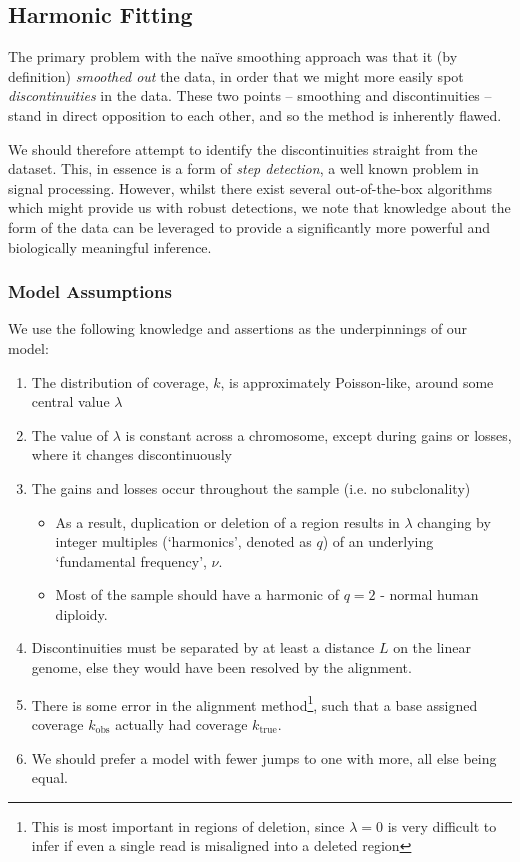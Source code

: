 \documentclass[fleqn,usenatbib]{mnras}
\begin{document}
		\subsection{Harmonic Fitting}

			The primary problem with the na\"ive smoothing approach was that it (by definition) \textit{smoothed out} the data, in order that we might more easily spot \textit{discontinuities} in the data. These two points -- smoothing and discontinuities -- stand in direct opposition to each other, and so the method is inherently flawed.

			We should therefore attempt to identify the discontinuities straight from the dataset. This, in essence is a form of \textit{step detection}, a well known problem in signal processing. However, whilst there exist several out-of-the-box algorithms which might provide us with robust detections, we note that knowledge about the form of the data can be leveraged to provide a significantly more powerful and biologically meaningful inference. 
			
			\subsubsection{Model Assumptions}
			
				We use the following knowledge and assertions as the underpinnings of our model:

				\begin{enumerate}
					\item The distribution of coverage, $k$, is approximately Poisson-like, around some central value $\lambda$
					\item The value of $\lambda$ is constant across a chromosome, except during gains or losses, where it changes discontinuously
					\item The gains and losses occur throughout the sample (i.e. no subclonality)
					\begin{itemize}
						\item As a result, duplication or deletion of a region results in $\lambda$ changing by integer multiples (`harmonics', denoted as $q$) of an underlying `fundamental frequency', $\nu$.
						\item Most of the sample should have a harmonic of $q = 2$ - normal human diploidy.
					\end{itemize}
					\item Discontinuities must be separated by at least a distance $L$ on the linear genome, else they would have been resolved by the alignment.
					\item There is some error in the alignment method\footnote{This is most important in regions of deletion, since $\lambda = 0$ is very difficult to infer if even a single read is misaligned into a deleted region}, such that a base assigned coverage $k_\text{obs}$ actually had coverage $k_\text{true}$.
					\item We should prefer a model with fewer jumps to one with more, all else being equal.
				\end{enumerate}
			
\end{document}
